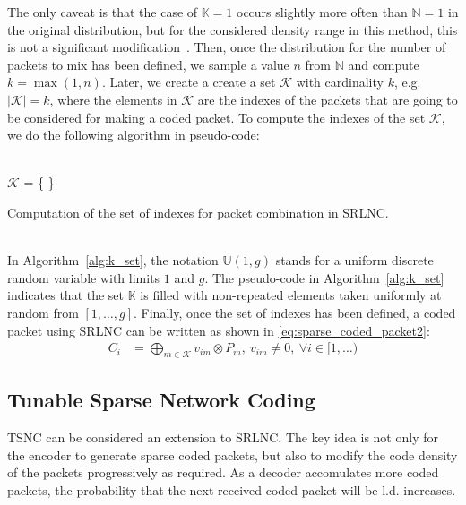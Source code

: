 The only caveat is that the case of $\mathbb{K} = 1$ occurs slightly
more often than $\mathbb{N} = 1$ in the original distribution, but for
the considered density range in this method, this is not a significant
modification~\cite{practicalview_tsnc2015}. Then, once the
distribution for the number of packets to mix has been defined, we
sample a value $n$ from $\mathbb{N}$ and compute $k =
\max(1,n)$. Later, we create a create a set $\mathcal{K}$ with
cardinality $k$, e.g. $|\mathcal{K}| = k$, where the elements in
$\mathcal{K}$ are the indexes of the packets that are going to be
considered for making a coded packet. To compute the indexes
of the set $\mathcal{K}$, we do the following algorithm in pseudo-code: \\
\ \\
\begin{algorithm}[H]
 \label{alg:k_set}
 $\mathcal{K}$ = \{ \}\;
 \caption{Computation of the set of indexes for packet combination in SRLNC.}
\end{algorithm}
\ \\
In Algorithm~\ref{alg:k_set}, the notation $\mathbb{U}(1,g)$ stands
for a uniform discrete random variable with limits $1$ and $g$. The
pseudo-code in Algorithm~\ref{alg:k_set} indicates that the set $\mathbb{K}$
is filled with non-repeated elements taken uniformly at random from
$[1,\ldots,g]$. Finally, once the set of indexes has been defined, a coded
packet using \ac{SRLNC} can be written as shown in
\eqref{eq:sparse_coded_packet2}:
%
\begin{align} \label{eq:sparse_coded_packet2}
    C_i  &= \bigoplus_{m \in \mathcal{K}} v_{im} \otimes P_{m},\ v_{im} \neq 0,\ \forall i \in [1,\ldots)
\end{align}

\subsection{Tunable Sparse Network Coding}

\ac{TSNC} can be considered an extension to \ac{SRLNC}. The key idea is
not only for the encoder to generate sparse coded packets, but also to
modify the code density of the packets progressively as required. As a
decoder accomulates more coded packets, the probability that the next
received coded packet will be \ac{l.d.} increases.

